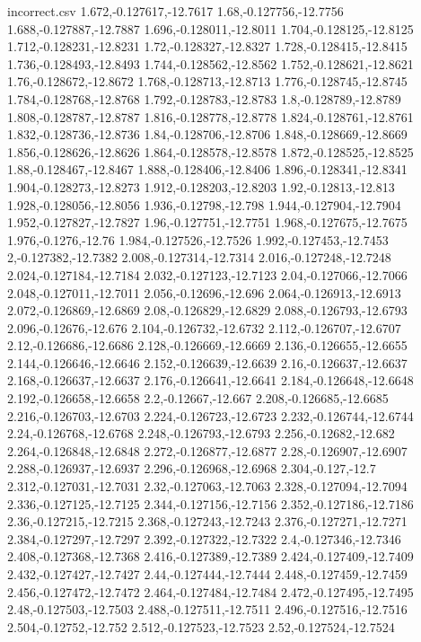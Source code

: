 \begin{filecontents*}{incorrect.csv}
1.672,-0.127617,-12.7617
1.68,-0.127756,-12.7756
1.688,-0.127887,-12.7887
1.696,-0.128011,-12.8011
1.704,-0.128125,-12.8125
1.712,-0.128231,-12.8231
1.72,-0.128327,-12.8327
1.728,-0.128415,-12.8415
1.736,-0.128493,-12.8493
1.744,-0.128562,-12.8562
1.752,-0.128621,-12.8621
1.76,-0.128672,-12.8672
1.768,-0.128713,-12.8713
1.776,-0.128745,-12.8745
1.784,-0.128768,-12.8768
1.792,-0.128783,-12.8783
1.8,-0.128789,-12.8789
1.808,-0.128787,-12.8787
1.816,-0.128778,-12.8778
1.824,-0.128761,-12.8761
1.832,-0.128736,-12.8736
1.84,-0.128706,-12.8706
1.848,-0.128669,-12.8669
1.856,-0.128626,-12.8626
1.864,-0.128578,-12.8578
1.872,-0.128525,-12.8525
1.88,-0.128467,-12.8467
1.888,-0.128406,-12.8406
1.896,-0.128341,-12.8341
1.904,-0.128273,-12.8273
1.912,-0.128203,-12.8203
1.92,-0.12813,-12.813
1.928,-0.128056,-12.8056
1.936,-0.12798,-12.798
1.944,-0.127904,-12.7904
1.952,-0.127827,-12.7827
1.96,-0.127751,-12.7751
1.968,-0.127675,-12.7675
1.976,-0.1276,-12.76
1.984,-0.127526,-12.7526
1.992,-0.127453,-12.7453
2,-0.127382,-12.7382
2.008,-0.127314,-12.7314
2.016,-0.127248,-12.7248
2.024,-0.127184,-12.7184
2.032,-0.127123,-12.7123
2.04,-0.127066,-12.7066
2.048,-0.127011,-12.7011
2.056,-0.12696,-12.696
2.064,-0.126913,-12.6913
2.072,-0.126869,-12.6869
2.08,-0.126829,-12.6829
2.088,-0.126793,-12.6793
2.096,-0.12676,-12.676
2.104,-0.126732,-12.6732
2.112,-0.126707,-12.6707
2.12,-0.126686,-12.6686
2.128,-0.126669,-12.6669
2.136,-0.126655,-12.6655
2.144,-0.126646,-12.6646
2.152,-0.126639,-12.6639
2.16,-0.126637,-12.6637
2.168,-0.126637,-12.6637
2.176,-0.126641,-12.6641
2.184,-0.126648,-12.6648
2.192,-0.126658,-12.6658
2.2,-0.12667,-12.667
2.208,-0.126685,-12.6685
2.216,-0.126703,-12.6703
2.224,-0.126723,-12.6723
2.232,-0.126744,-12.6744
2.24,-0.126768,-12.6768
2.248,-0.126793,-12.6793
2.256,-0.12682,-12.682
2.264,-0.126848,-12.6848
2.272,-0.126877,-12.6877
2.28,-0.126907,-12.6907
2.288,-0.126937,-12.6937
2.296,-0.126968,-12.6968
2.304,-0.127,-12.7
2.312,-0.127031,-12.7031
2.32,-0.127063,-12.7063
2.328,-0.127094,-12.7094
2.336,-0.127125,-12.7125
2.344,-0.127156,-12.7156
2.352,-0.127186,-12.7186
2.36,-0.127215,-12.7215
2.368,-0.127243,-12.7243
2.376,-0.127271,-12.7271
2.384,-0.127297,-12.7297
2.392,-0.127322,-12.7322
2.4,-0.127346,-12.7346
2.408,-0.127368,-12.7368
2.416,-0.127389,-12.7389
2.424,-0.127409,-12.7409
2.432,-0.127427,-12.7427
2.44,-0.127444,-12.7444
2.448,-0.127459,-12.7459
2.456,-0.127472,-12.7472
2.464,-0.127484,-12.7484
2.472,-0.127495,-12.7495
2.48,-0.127503,-12.7503
2.488,-0.127511,-12.7511
2.496,-0.127516,-12.7516
2.504,-0.12752,-12.752
2.512,-0.127523,-12.7523
2.52,-0.127524,-12.7524

\end{filecontents*}
